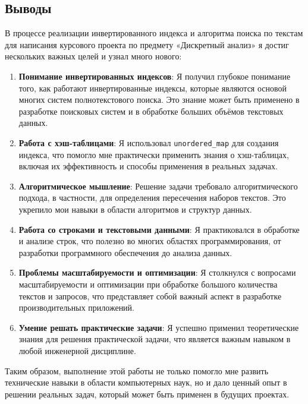 \documentclass[12pt]{article}
\begin{document}
\subsection*{Выводы}

В процессе реализации инвертированного индекса и алгоритма поиска по текстам для написания курсового проекта по предмету «Дискретный анализ» я достиг нескольких важных целей и узнал много нового:

\begin{enumerate}
    \item \textbf{Понимание инвертированных индексов}: Я получил глубокое понимание того, как работают инвертированные индексы, которые являются основой многих систем полнотекстового поиска. Это знание может быть применено в разработке поисковых систем и в обработке больших объёмов текстовых данных.
    \item \textbf{Работа с хэш-таблицами}: Я использовал \texttt{unordered\_map} для создания индекса, что помогло мне практически применить знания о хэш-таблицах, включая их эффективность и способы применения в реальных задачах.
    \item \textbf{Алгоритмическое мышление}: Решение задачи требовало алгоритмического подхода, в частности, для определения пересечения наборов текстов. Это укрепило мои навыки в области алгоритмов и структур данных.
    \item \textbf{Работа со строками и текстовыми данными}: Я практиковался в обработке и анализе строк, что полезно во многих областях программирования, от разработки программного обеспечения до анализа данных.
    \item \textbf{Проблемы масштабируемости и оптимизации}: Я столкнулся с вопросами масштабируемости и оптимизации при обработке большого количества текстов и запросов, что представляет собой важный аспект в разработке производительных приложений.
    \item \textbf{Умение решать практические задачи}: Я успешно применил теоретические знания для решения практической задачи, что является важным навыком в любой инженерной дисциплине.
\end{enumerate}

Таким образом, выполнение этой работы не только помогло мне развить технические навыки в области компьютерных наук, но и дало ценный опыт в решении реальных задач, который может быть применен в будущих проектах.
\end{document}
